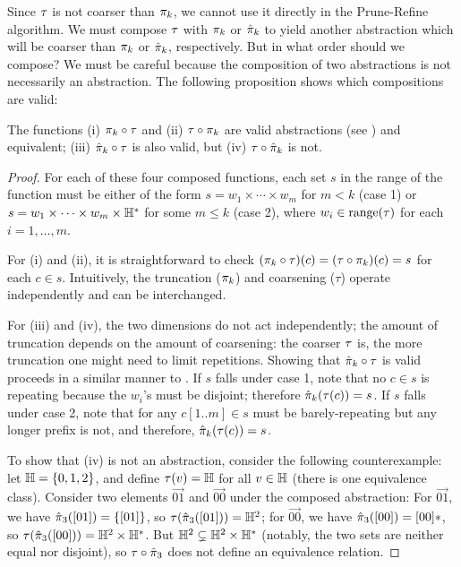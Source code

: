 Since $\tau$ is not coarser than $\pi_k$, we cannot
use it directly in the Prune-Refine algorithm.
We must compose $\tau$ with $\pi_k$ or $\hat{\pi}_k$ to yield another
abstraction which will be coarser than $\pi_k$ or $\hat{\pi}_k$,
respectively.  But in what order should we compose?
We must be careful because the composition of two abstractions is not necessarily an abstraction.
The following proposition shows which compositions are valid:
\begin{proposition}
The functions
(i) $\pi_k \circ \tau$ and (ii) $\tau \circ \pi_k$
are valid abstractions (see ) and equivalent;
(iii) $\hat{\pi}_k \circ \tau$ is also valid,
but (iv) $\tau \circ \hat{\pi}_k$ is not.
\end{proposition}
\begin{proof}
For each of these four composed functions, each set $s$ in the range of the function
must be either of the form $s = w_1 \times \cdots \times w_m$ for $m < k$ (case 1)
or $s = w_1 \times \cdots \times w_m \times {\mathbb H}^*$ for some $m \le k$ (case 2),
where $w_i \in \text{\rm range}(\tau)$ for each $i = 1, \dots, m$.

For (i) and (ii), it is straightforward to check
$(\pi_k \circ \tau)(c) = (\tau \circ \pi_k)(c) = s$ for each $c \in s$.
Intuitively, the truncation ($\pi_k$) and coarsening ($\tau$) operate
independently and can be interchanged.

For (iii) and (iv), the two dimensions do not act independently;
the amount of truncation depends on the amount of coarsening:
the coarser $\tau$ is, the more truncation one might need to limit repetitions.
Showing that $\hat{\pi}_k \circ \tau$ is valid
proceeds in a similar manner to .
If $s$ falls under case 1, note that no $c \in s$ is repeating
because the $w_i$'s must be disjoint; therefore $\hat{\pi}_k(\tau(c)) = s$.
If $s$ falls under case 2, note that for any $c[1..m] \in s$ must be barely-repeating but any longer prefix is not,
and therefore, $\hat{\pi}_k(\tau(c)) = s$.

To show that (iv) is not an abstraction,
consider the following counterexample:
let ${\mathbb H} = \{ 0,1,2 \}$,
and define $\tau(v) = {\mathbb H}$ for all $v \in {\mathbb H}$
(there is one equivalence class).
Consider two elements $\vec{01}$ and $\vec{00}$ under the composed abstraction:
For $\vec{01}$, we have $\hat{\pi}_3([01]) = \{ [01 ]\}$,
so $\tau(\hat{\pi}_3([01])) = {\mathbb H}^2$;
for $\vec{00}$, we have $\hat{\pi}_3([00]) = [00]*$,
so $\tau(\hat{\pi}_3([00])) = {\mathbb H}^2 \times {\mathbb H}^*$.
But ${\mathbb H}^2 \subsetneq {\mathbb H}^2 \times {\mathbb H}^*$ (notably,
the two sets are neither equal nor disjoint),
so $\tau \circ \hat{\pi}_3$ does not define an equivalence relation.
\end{proof}

